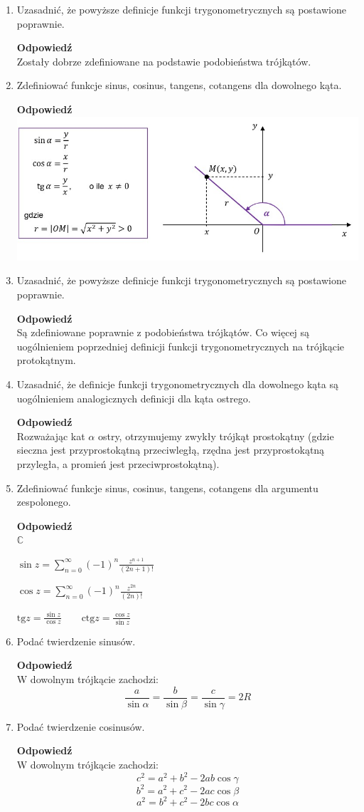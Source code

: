\documentclass[12pt,a4paper]{article}
\newcounter{twierdzenie}
\theoremstyle{break}
\newcommand{\Odp}[1]{
		\begin{mdframed}[style=zadanie]
			\textbf{Odpowiedź}\\
			#1
		\end{mdframed}
	}
\newcommand{\tg}{\text{tg}}
\newcommand{\ctg}{\text{ctg}}
\begin{document}
\begin{enumerate}[1.]
	\item Uzasadnić, że powyższe deﬁnicje funkcji trygonometrycznych są postawione poprawnie.
	\Odp{
		Zostały dobrze zdefiniowane na podstawie podobieństwa trójkątów.
	}
	
	\item Zdeﬁniować funkcje sinus, cosinus, tangens, cotangens dla dowolnego kąta.
	\Odp{
		\includegraphics[width=\linewidth]{tryg_def.jpeg}
	}
	
	\item Uzasadnić, że powyższe deﬁnicje funkcji trygonometrycznych są postawione poprawnie.
	\Odp{
		Są zdefiniowane poprawnie z podobieństwa trójkątów. Co więcej są uogólnieniem poprzedniej definicji funkcji trygonometrycznych na trójkącie protokątnym.
	}
	
	\item Uzasadnić, że deﬁnicje funkcji trygonometrycznych dla dowolnego kąta są uogólnieniem analogicznych deﬁnicji dla kąta ostrego.
	\Odp{
		Rozważając kat $\alpha$ ostry, otrzymujemy zwykły trójkąt prostokątny (gdzie sieczna jest przyprostokątną przeciwległą, rzędna jest przyprostokątną przyległa, a promień jest przeciwprostokątną).
	}
	
	\item Zdeﬁniować funkcje sinus, cosinus, tangens, cotangens dla argumentu zespolonego.
	\Odp{
		$\mathbb{C}$
		
		$\sin z=\sum_{n=0}^{\infty}(-1)^n\frac{z^{n+1}}{(2n+1)!}$
		
		$\cos z=\sum_{n=0}^{\infty}(-1)^n\frac{z^{2n}}{(2n)!}$
		
		$\tg z=\frac{\sin z}{\cos z} \qquad \ctg z=\frac{\cos z}{\sin z}$
	}
	
	\item Podać twierdzenie sinusów.
	\Odp{
		W dowolnym trójkącie zachodzi:
		$$\frac{a}{\sin\alpha}=\frac{b}{\sin\beta}=\frac{c}{\sin\gamma}=2R$$
	}
	
	\item Podać twierdzenie cosinusów.
	\Odp{
		W dowolnym trójkącie zachodzi:
		$$c^2=a^2+b^2-2ab\cos\gamma$$
		$$b^2=a^2+c^2-2ac\cos\beta$$
		$$a^2=b^2+c^2-2bc\cos\alpha$$
	}
	

\end{enumerate}
\end{document}

